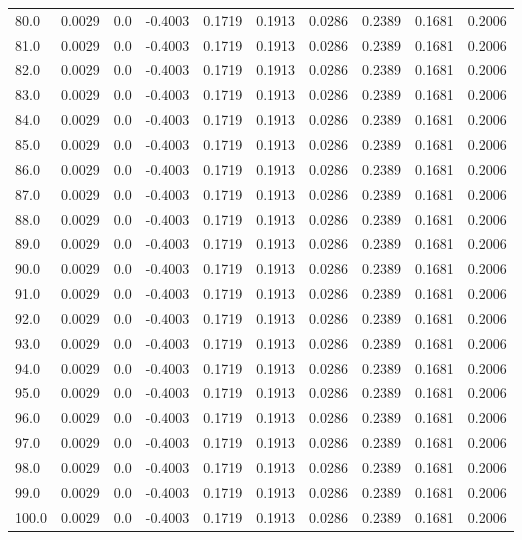 \begin{longtable}{lrrrrrrrrr}
80.0 & 0.0029 & 0.0 & -0.4003 & 0.1719 & 0.1913 & 0.0286 & 0.2389 & 0.1681 & 0.2006 \\
81.0 & 0.0029 & 0.0 & -0.4003 & 0.1719 & 0.1913 & 0.0286 & 0.2389 & 0.1681 & 0.2006 \\
82.0 & 0.0029 & 0.0 & -0.4003 & 0.1719 & 0.1913 & 0.0286 & 0.2389 & 0.1681 & 0.2006 \\
83.0 & 0.0029 & 0.0 & -0.4003 & 0.1719 & 0.1913 & 0.0286 & 0.2389 & 0.1681 & 0.2006 \\
84.0 & 0.0029 & 0.0 & -0.4003 & 0.1719 & 0.1913 & 0.0286 & 0.2389 & 0.1681 & 0.2006 \\
85.0 & 0.0029 & 0.0 & -0.4003 & 0.1719 & 0.1913 & 0.0286 & 0.2389 & 0.1681 & 0.2006 \\
86.0 & 0.0029 & 0.0 & -0.4003 & 0.1719 & 0.1913 & 0.0286 & 0.2389 & 0.1681 & 0.2006 \\
87.0 & 0.0029 & 0.0 & -0.4003 & 0.1719 & 0.1913 & 0.0286 & 0.2389 & 0.1681 & 0.2006 \\
88.0 & 0.0029 & 0.0 & -0.4003 & 0.1719 & 0.1913 & 0.0286 & 0.2389 & 0.1681 & 0.2006 \\
89.0 & 0.0029 & 0.0 & -0.4003 & 0.1719 & 0.1913 & 0.0286 & 0.2389 & 0.1681 & 0.2006 \\
90.0 & 0.0029 & 0.0 & -0.4003 & 0.1719 & 0.1913 & 0.0286 & 0.2389 & 0.1681 & 0.2006 \\
91.0 & 0.0029 & 0.0 & -0.4003 & 0.1719 & 0.1913 & 0.0286 & 0.2389 & 0.1681 & 0.2006 \\
92.0 & 0.0029 & 0.0 & -0.4003 & 0.1719 & 0.1913 & 0.0286 & 0.2389 & 0.1681 & 0.2006 \\
93.0 & 0.0029 & 0.0 & -0.4003 & 0.1719 & 0.1913 & 0.0286 & 0.2389 & 0.1681 & 0.2006 \\
94.0 & 0.0029 & 0.0 & -0.4003 & 0.1719 & 0.1913 & 0.0286 & 0.2389 & 0.1681 & 0.2006 \\
95.0 & 0.0029 & 0.0 & -0.4003 & 0.1719 & 0.1913 & 0.0286 & 0.2389 & 0.1681 & 0.2006 \\
96.0 & 0.0029 & 0.0 & -0.4003 & 0.1719 & 0.1913 & 0.0286 & 0.2389 & 0.1681 & 0.2006 \\
97.0 & 0.0029 & 0.0 & -0.4003 & 0.1719 & 0.1913 & 0.0286 & 0.2389 & 0.1681 & 0.2006 \\
98.0 & 0.0029 & 0.0 & -0.4003 & 0.1719 & 0.1913 & 0.0286 & 0.2389 & 0.1681 & 0.2006 \\
99.0 & 0.0029 & 0.0 & -0.4003 & 0.1719 & 0.1913 & 0.0286 & 0.2389 & 0.1681 & 0.2006 \\
100.0 & 0.0029 & 0.0 & -0.4003 & 0.1719 & 0.1913 & 0.0286 & 0.2389 & 0.1681 & 0.2006 \\

\end{longtable}
